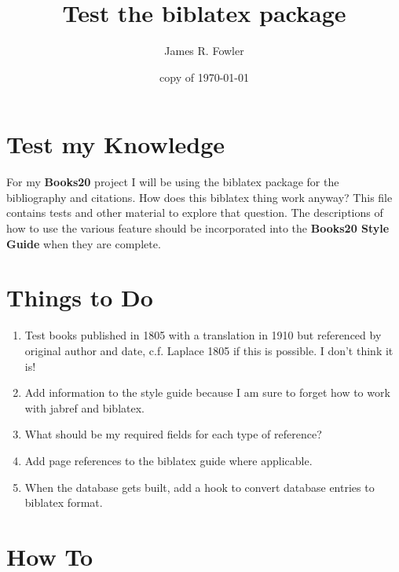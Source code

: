 \documentclass{article}
\begin{document}
\title{Test the {\ttfamily biblatex} package}
\author{James R. Fowler}
\date{copy of \today}
\maketitle


\section{Test my Knowledge}

For my {\bfseries Books20} project I will be using the {\ttfamily
  biblatex} \cite{Kime2019} package for the bibliography and citations.
How does this {\ttfamily biblatex} thing work anyway? This file
contains tests and other material to explore that question.  The
descriptions of how to use the various feature should be incorporated
into the {\bfseries Books20 Style Guide} when they are complete.


\section{Things to Do}

\begin{enumerate}
  \item Test books published in 1805 with a translation in 1910 but
    referenced by original author and date, c.f. Laplace 1805
    \cite{Laplace1805} if this is possible. I don't think it is!

  \item Add information to the style guide because I am sure to forget
    how to work with {\ttfamily jabref} and {\ttfamily biblatex}.

  \item What should be my required fields for each type of reference?

  \item Add page references to the {\ttfamily biblatex} guide
    \cite{Kime2019} where applicable.
    
  \item When the database gets built, add a hook to convert database
    entries to {\ttfamily biblatex} format.

\end{enumerate}

\section{How To}
\end{document}
